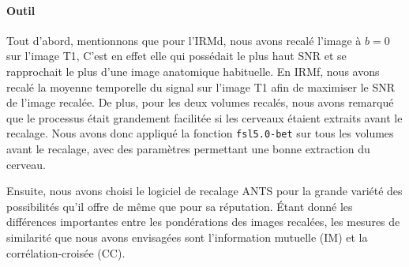 \documentclass[a4paper]{article}
\begin{document}
\paragraph{Outil}
Tout d'abord, mentionnons que pour l'IRMd, nous avons recalé l'image à $b=0$ sur l'image T1, C'est en effet elle qui possédait le plus haut SNR et se rapprochait le plus d'une image anatomique habituelle. En IRMf, nous avons recalé la moyenne temporelle du signal sur l'image T1 afin de maximiser le SNR de l'image recalée. De plus, pour les deux volumes recalés, nous avons remarqué que le processus était grandement facilitée si les cerveaux étaient \og extraits \fg  avant le recalage. Nous avons donc appliqué la fonction \lstinline{fsl5.0-bet} sur tous les volumes avant le recalage, avec des paramètres permettant une bonne extraction du cerveau.

Ensuite, nous avons choisi le logiciel de recalage ANTS pour la grande variété des possibilités qu'il offre de même que pour sa réputation. Étant donné les différences importantes entre les pondérations des images recalées, les mesures de similarité que nous avons envisagées sont l'information mutuelle (IM) et la corrélation-croisée (CC). 
\end{document}
